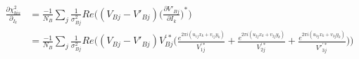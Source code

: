 \begin{equation}
    \label{eq:grad_step5}
    \begin{split}
        \frac{\partial{\chi^{2}_{bis}}}{\partial_{I_{k}}} &= \frac{-1}{N_{B}} \sum_{j} \frac{1}{\sigma^{2}_{Bj}} Re\bigg((V_{Bj} - V'_{Bj}) \bigg( \frac{\partial{V'_{Bj}}}{\partial{I_{k}}} \bigg)^{*} \bigg) \\
        &= \frac{-1}{N_{B}} \sum_{j} \frac{1}{\sigma^{2}_{Bj}} Re\bigg((V_{Bj} - V'_{Bj}) V^{'*}_{Bj} \bigg( \frac{e^{2\pi i (u_{1j}x_{k} + v_{1j}y_{k})}}{V^{'*}_{1j}} + \frac{e^{2\pi i (u_{2j}x_{k} + v_{2j}y_{k})}}{V^{'*}_{2j}} + \frac{e^{2\pi i (u_{3j}x_{k} + v_{3j}y_{k})}}{V'^{'*}_{3j}}\bigg) \bigg) 
    \end{split}
\end{equation}
